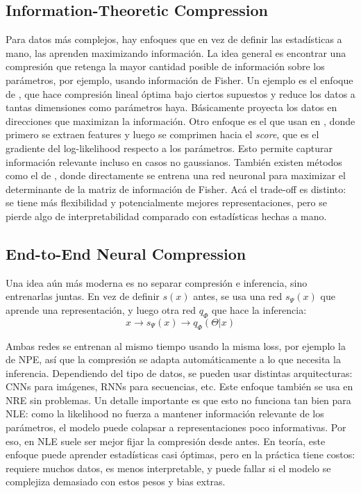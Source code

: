 \subsection{Information-Theoretic Compression}

Para datos más complejos, hay enfoques que en vez de definir las estadísticas a mano, las aprenden maximizando información. La idea general es encontrar una compresión que retenga la mayor cantidad posible de información sobre los parámetros, por ejemplo, usando información de Fisher. Un ejemplo es el enfoque de \cite{heavens2000}, que hace compresión lineal óptima bajo ciertos supuestos y reduce los datos a tantas dimensiones como parámetros haya. Básicamente proyecta los datos en direcciones que maximizan la información. Otro enfoque es el que usan en \cite{alsing2018}, donde primero se extraen features y luego se comprimen hacia el \textit{score}, que es el gradiente del log-likelihood respecto a los parámetros. Esto permite capturar información relevante incluso en casos no gaussianos. También existen métodos como el de \cite{charnock2018}, donde directamente se entrena una red neuronal para maximizar el determinante de la matriz de información de Fisher. Acá el trade-off es distinto: se tiene más flexibilidad y potencialmente mejores representaciones, pero se pierde algo de interpretabilidad comparado con estadísticas hechas a mano.

\subsection{End-to-End Neural Compression}

Una idea aún más moderna es no separar compresión e inferencia, sino entrenarlas juntas. En vez de definir $s(x)$ antes, se usa una red $s_{\Psi}(x)$ que aprende una representación, y luego otra red $q_{\Phi}$ que hace la inferencia:
\[
x \rightarrow s_{\Psi}(x) \rightarrow q_{\Phi}(\Theta|x)
\]

Ambas redes se entrenan al mismo tiempo usando la misma loss, por ejemplo la de NPE, así que la compresión se adapta automáticamente a lo que necesita la inferencia. Dependiendo del tipo de datos, se pueden usar distintas arquitecturas: CNNs para imágenes, RNNs para secuencias, etc. Este enfoque también se usa en NRE sin problemas. Un detalle importante es que esto no funciona tan bien para NLE: como la likelihood no fuerza a mantener información relevante de los parámetros, el modelo puede colapsar a representaciones poco informativas. Por eso, en NLE suele ser mejor fijar la compresión desde antes. En teoría, este enfoque puede aprender estadísticas casi óptimas, pero en la práctica tiene costos: requiere muchos datos, es menos interpretable, y puede fallar si el modelo se complejiza demasiado con estos pesos y bias extras.


